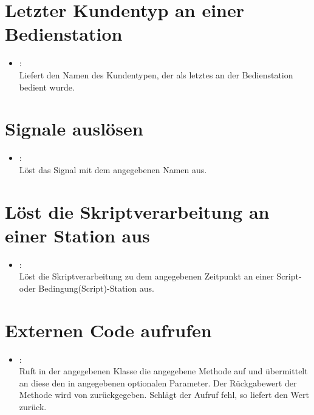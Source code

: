 \section{Letzter Kundentyp an einer Bedienstation}

\begin{itemize}

\item
{}:\\
Liefert den Namen des Kundentypen, der als letztes an der Bedienstation bedient wurde.

\end{itemize}

\section{Signale auslösen}

\begin{itemize}

\item
{}:\\
Löst das Signal mit dem angegebenen Namen aus.

\end{itemize}

\section{Löst die Skriptverarbeitung an einer Station aus}

\begin{itemize}

\item
{}:\\
Löst die Skriptverarbeitung zu dem angegebenen Zeitpunkt an einer Script- oder Bedingung(Script)-Station aus.

\end{itemize}

\section{Externen Code aufrufen}

\begin{itemize}

\item
{}:\\
Ruft in der angegebenen Klasse die angegebene Methode auf und übermittelt an diese den in
 angegebenen optionalen Parameter. Der Rückgabewert der Methode wird von 
zurückgegeben. Schlägt der Aufruf fehl, so liefert  den Wert  zurück.
\end{itemize}

